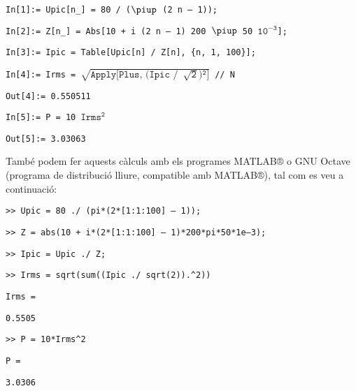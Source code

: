 \begin{exemple}
    \hspace{1cm}\texttt{In[1]:= Upic[n\_] = 80 / ($\mathtt{\piup}$ (2 n -- 1));}

    \hspace{1cm}\texttt{In[2]:= Z[n\_] = Abs[10 + i (2 n -- 1) 200 $\mathtt{\piup}$ 50 $\mathtt{10^{-3}}$];}

    \hspace{1cm}\texttt{In[3]:= Ipic = Table[Upic[n] / Z[n], \{n, 1, 100\}];}

    \hspace{1cm}\texttt{In[4]:= Irms = $\mathtt{\sqrt{\text{Apply[Plus, (Ipic /}\phantom{1} \sqrt{2}\text{)}{\phantom{}^2}\text{]}}}$ // N}

    \hspace{1cm}\texttt{Out[4]:= 0.550511}

    \hspace{1cm}\texttt{In[5]:= P = 10 $\mathtt{Irms^2}$}

    \hspace{1cm}\texttt{Out[5]:= 3.03063}\newline

    També podem fer aquests càlculs amb els programes
    MATLAB® o GNU Octave (programa de distribució lliure, compatible amb MATLAB®), tal com es veu a continuació:


    \hspace{1cm}\texttt{>{}> Upic = 80 ./ (pi*(2*[1:1:100] -- 1));}

    \hspace{1cm}\texttt{>{}> Z = abs(10 + i*(2*[1:1:100] -- 1)*200*pi*50*1e--3);}

    \hspace{1cm}\texttt{>{}> Ipic = Upic ./ Z;}

    \hspace{1cm}\texttt{>{}> Irms = sqrt(sum((Ipic ./ sqrt(2)).\^{}2))}

    \hspace{1cm}\texttt{Irms =}

    \hspace{1cm}\texttt{\phantom{Irms }0.5505}

    \hspace{1cm}\texttt{>{}> P = 10*Irms\^{}2}

    \hspace{1cm}\texttt{P =}

    \hspace{1cm}\texttt{\phantom{Irms }3.0306}\newline



\end{exemple}

